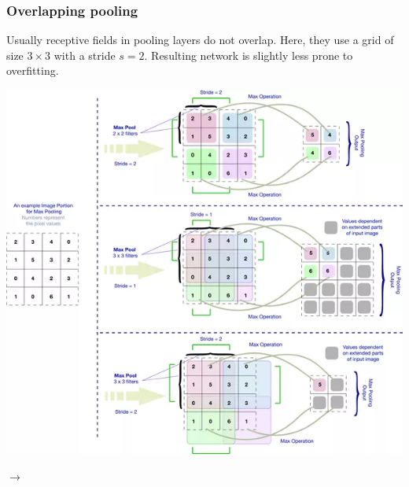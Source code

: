 \begin{frame}
	\frametitle{Overlapping pooling}
	
	Usually receptive fields in pooling layers do not overlap. Here, they use a grid of size $3 \times 3$ with a stride $s=2$. Resulting network is slightly less prone to overfitting.
	
	\medskip
	
	\begin{center}
		\includegraphics[scale=0.38]{figs/pooling_overlapping}
	\end{center}

\medskip

$\rightarrow$ 
	
\end{frame}



